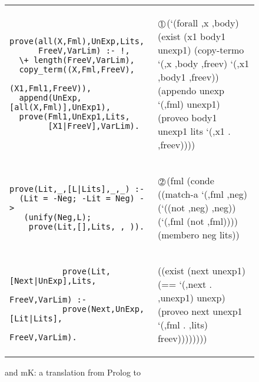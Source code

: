 \begin{figure}[H]
\begin{tabular}{l l}
\begin{minipage}{2in}
\begin{verbatim}
prove(all(X,Fml),UnExp,Lits,
      FreeV,VarLim) :- !,
  \+ length(FreeV,VarLim),
  copy_term((X,Fml,FreeV),
            (X1,Fml1,FreeV)),
  append(UnExp,[all(X,Fml)],UnExp1),
  prove(Fml1,UnExp1,Lits,
        [X1|FreeV],VarLim).
\end{verbatim}
\end{minipage}
 &
\begin{minipage}{2in}
\begin{schemedisplay}
     $\onet$(`(forall ,x ,body)
         (exist (x1 body1 unexp1)
           (copy-termo `(,x ,body ,freev) 
                       `(,x1 ,body1 ,freev))
           (appendo unexp `(,fml) unexp1)
           (proveo body1 unexp1 lits 
                   `(,x1 . ,freev))))
\end{schemedisplay}
\end{minipage}
\\

\begin{minipage}{2in}
\begin{verbatim}
prove(Lit,_,[L|Lits],_,_) :-
  (Lit = -Neg; -Lit = Neg) ->
   (unify(Neg,L); 
    prove(Lit,[],Lits,_,_)).
\end{verbatim}

\end{minipage}
 &
\begin{minipage}{2in}
\begin{schemedisplay}
     $\twot$(fml
         (conde
           ((match-a `(,fml ,neg)
              (`((not ,neg) ,neg))
              (`(,fml (not ,fml))))
            (membero neg lits))
           \end{schemedisplay}
           \end{minipage}
           \\

           \begin{minipage}{2in}
           \begin{verbatim}
           prove(Lit,[Next|UnExp],Lits,
                    FreeV,VarLim) :-
           prove(Next,UnExp,[Lit|Lits],
                           FreeV,VarLim).
           \end{verbatim} 
           \end{minipage}
           &
           \begin{minipage}{2in}
           \begin{schemedisplay}
        ((exist (next unexp1)
           (== `(,next . ,unexp1) unexp)
           (proveo next unexp1 `(,fml . ,lits) 
                   freev))))))))
\end{schemedisplay}
\end{minipage}
\\


\end{tabular}
\caption{\leantapsp and mK\leantap\thinspace: a translation from Prolog to \alphakanren
  \label{fig:translation}}
\end{figure}


